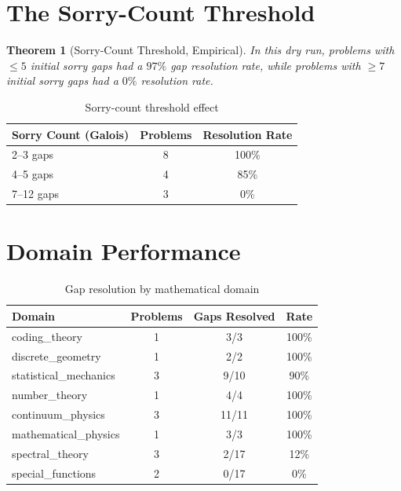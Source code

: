 \documentclass[12pt,a4paper]{report}
\theoremstyle{plain}
\newtheorem{theorem}{Theorem}[chapter]
\theoremstyle{definition}
\theoremstyle{remark}
\begin{document}
\section{The Sorry-Count Threshold}

\begin{theorem}[Sorry-Count Threshold, Empirical]
In this dry run, problems with $\leq 5$ initial sorry gaps had a $97\%$ gap
resolution rate, while problems with $\geq 7$ initial sorry gaps had a $0\%$
resolution rate.
\end{theorem}

\begin{table}[h!]
\centering
\begin{tabular}{lcc}
\toprule
\textbf{Sorry Count (Galois)} & \textbf{Problems} & \textbf{Resolution Rate} \\
\midrule
2--3 gaps & 8 & 100\% \\
4--5 gaps & 4 & 85\% \\
7--12 gaps & 3 & 0\% \\
\bottomrule
\end{tabular}
\caption{Sorry-count threshold effect}
\end{table}

\section{Domain Performance}

\begin{table}[h!]
\centering
\begin{tabular}{lccc}
\toprule
\textbf{Domain} & \textbf{Problems} & \textbf{Gaps Resolved} & \textbf{Rate} \\
\midrule
coding\_theory & 1 & 3/3 & 100\% \\
discrete\_geometry & 1 & 2/2 & 100\% \\
statistical\_mechanics & 3 & 9/10 & 90\% \\
number\_theory & 1 & 4/4 & 100\% \\
continuum\_physics & 3 & 11/11 & 100\% \\
mathematical\_physics & 1 & 3/3 & 100\% \\
spectral\_theory & 3 & 2/17 & 12\% \\
special\_functions & 2 & 0/17 & 0\% \\
\bottomrule
\end{tabular}
\caption{Gap resolution by mathematical domain}
\end{table}

\end{document}
